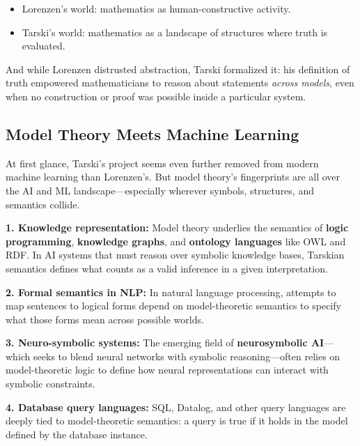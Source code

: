\begin{itemize}
  \item Lorenzen’s world: mathematics as human-constructive activity.
  \item Tarski’s world: mathematics as a landscape of structures where truth is evaluated.
\end{itemize}

And while Lorenzen distrusted abstraction, Tarski formalized it: his definition of truth empowered mathematicians to reason about statements \emph{across models}, even when no construction or proof was possible inside a particular system.

\vspace{1em}

\subsection{Model Theory Meets Machine Learning}

At first glance, Tarski’s project seems even further removed from modern machine learning than Lorenzen’s. But model theory’s fingerprints are all over the AI and ML landscape—especially wherever symbols, structures, and semantics collide.

\textbf{1. Knowledge representation:}  
Model theory underlies the semantics of \textbf{logic programming}, \textbf{knowledge graphs}, and \textbf{ontology languages} like OWL and RDF. In AI systems that must reason over symbolic knowledge bases, Tarskian semantics defines what counts as a valid inference in a given interpretation.

\textbf{2. Formal semantics in NLP:}  
In natural language processing, attempts to map sentences to logical forms depend on model-theoretic semantics to specify what those forms mean across possible worlds.

\textbf{3. Neuro-symbolic systems:}  
The emerging field of \textbf{neurosymbolic AI}—which seeks to blend neural networks with symbolic reasoning—often relies on model-theoretic logic to define how neural representations can interact with symbolic constraints.

\textbf{4. Database query languages:}  
SQL, Datalog, and other query languages are deeply tied to model-theoretic semantics: a query is true if it holds in the model defined by the database instance.

